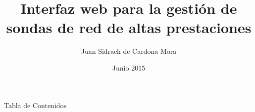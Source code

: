\documentclass[10pt, compress]{beamer}
\title{Interfaz web para la gestión de sondas de red de altas prestaciones}
\date{Junio 2015}
\author{Juan Sidrach de Cardona Mora}
\institute{High-Performance Computing and Networking}
\begin{document}
\maketitle

\begin{frame}{Tabla de Contenidos}
 \tableofcontents
\end{frame}















\end{document}
